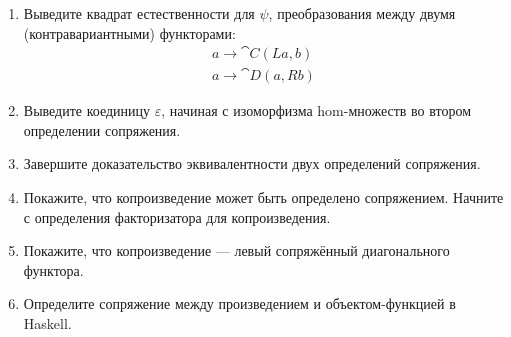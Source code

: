 \begin{enumerate}
  \tightlist
  \item
        Выведите квадрат естественности для $\psi$, преобразования
        между двумя (контравариантными) функторами:
        \begin{gather*}
          a \to \cat{C}(L a, b) \\
          a \to \cat{D}(a, R b)
        \end{gather*}
  \item
        Выведите коединицу $\varepsilon$, начиная с изоморфизма hom-множеств во
        втором определении сопряжения.
  \item
        Завершите доказательство эквивалентности двух определений
        сопряжения.
  \item
        Покажите, что копроизведение может быть определено сопряжением. Начните с
        определения факторизатора для копроизведения.
  \item
        Покажите, что копроизведение --- левый сопряжённый диагонального функтора.
  \item
        Определите сопряжение между произведением и объектом-функцией в
        Haskell.
\end{enumerate}
